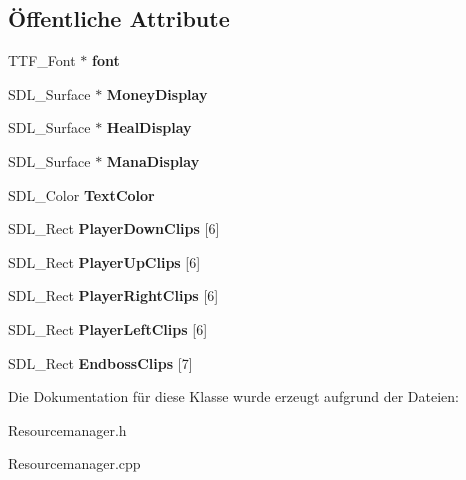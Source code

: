 \subsection*{Öffentliche Attribute}
\begin{DoxyCompactItemize}
\item 
\hypertarget{class_s___resourcemanager_a33c6b528491d39021acbff6dc692105c}{T\-T\-F\-\_\-\-Font $\ast$ {\bfseries font}}\label{class_s___resourcemanager_a33c6b528491d39021acbff6dc692105c}

\item 
\hypertarget{class_s___resourcemanager_aeaffe8033a3c754b1d4b7ac7ab3ccd85}{S\-D\-L\-\_\-\-Surface $\ast$ {\bfseries Money\-Display}}\label{class_s___resourcemanager_aeaffe8033a3c754b1d4b7ac7ab3ccd85}

\item 
\hypertarget{class_s___resourcemanager_a8123d7ef848a8796a783e5a22a401274}{S\-D\-L\-\_\-\-Surface $\ast$ {\bfseries Heal\-Display}}\label{class_s___resourcemanager_a8123d7ef848a8796a783e5a22a401274}

\item 
\hypertarget{class_s___resourcemanager_abd22829bb772bed90d54906afd3ff591}{S\-D\-L\-\_\-\-Surface $\ast$ {\bfseries Mana\-Display}}\label{class_s___resourcemanager_abd22829bb772bed90d54906afd3ff591}

\item 
\hypertarget{class_s___resourcemanager_a80a1e4c840eb27a2b98f5b54250d4528}{S\-D\-L\-\_\-\-Color {\bfseries Text\-Color}}\label{class_s___resourcemanager_a80a1e4c840eb27a2b98f5b54250d4528}

\item 
\hypertarget{class_s___resourcemanager_ad807253d4166886c26626fea9f6575dd}{S\-D\-L\-\_\-\-Rect {\bfseries Player\-Down\-Clips} \mbox{[}6\mbox{]}}\label{class_s___resourcemanager_ad807253d4166886c26626fea9f6575dd}

\item 
\hypertarget{class_s___resourcemanager_ae572d384d320a06611c9c758862b0e14}{S\-D\-L\-\_\-\-Rect {\bfseries Player\-Up\-Clips} \mbox{[}6\mbox{]}}\label{class_s___resourcemanager_ae572d384d320a06611c9c758862b0e14}

\item 
\hypertarget{class_s___resourcemanager_a2bc8ae381b2c62e527fa45c45dd569ea}{S\-D\-L\-\_\-\-Rect {\bfseries Player\-Right\-Clips} \mbox{[}6\mbox{]}}\label{class_s___resourcemanager_a2bc8ae381b2c62e527fa45c45dd569ea}

\item 
\hypertarget{class_s___resourcemanager_ac84b018abfae853121018e771707aa76}{S\-D\-L\-\_\-\-Rect {\bfseries Player\-Left\-Clips} \mbox{[}6\mbox{]}}\label{class_s___resourcemanager_ac84b018abfae853121018e771707aa76}

\item 
\hypertarget{class_s___resourcemanager_a70e4606e4a47f8130fb4e083289c1745}{S\-D\-L\-\_\-\-Rect {\bfseries Endboss\-Clips} \mbox{[}7\mbox{]}}\label{class_s___resourcemanager_a70e4606e4a47f8130fb4e083289c1745}

\end{DoxyCompactItemize}


Die Dokumentation für diese Klasse wurde erzeugt aufgrund der Dateien\-:\begin{DoxyCompactItemize}
\item 
Resourcemanager.\-h\item 
Resourcemanager.\-cpp\end{DoxyCompactItemize}
